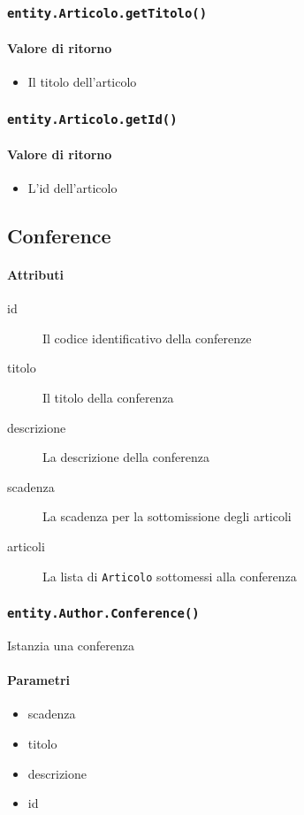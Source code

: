 \subsubsection{\texttt{entity.Articolo.getTitolo()}}
\paragraph{Valore di ritorno}
\begin{itemize}
\item Il titolo dell'articolo
\end{itemize}

\subsubsection{\texttt{entity.Articolo.getId()}}
\paragraph{Valore di ritorno}
\begin{itemize}
\item L'id dell'articolo
\end{itemize}

\subsection{Conference}
\paragraph{Attributi}
\begin{description}
\item[id] Il codice identificativo della conferenze
\item[titolo] Il titolo della conferenza
\item[descrizione] La descrizione della conferenza
\item[scadenza] La scadenza per la sottomissione degli articoli
\item[articoli] La lista di \texttt{Articolo} sottomessi alla conferenza
\end{description}

\subsubsection{\texttt{entity.Author.Conference()}}
Istanzia una conferenza
\paragraph{Parametri}
\begin{itemize}
\item scadenza
\item titolo
\item descrizione
\item id
\end{itemize}


